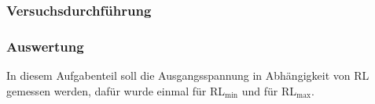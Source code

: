 \documentclass[12pt,a4paper]{article}
\begin{document}
\subsubsection{Versuchsdurchführung}
\subsubsection{Auswertung}

In diesem Aufgabenteil soll die Ausgangsspannung in Abhängigkeit von RL gemessen werden, dafür wurde einmal für RL$_\text{min}$ und für RL$_\text{max}$.
\end{document}
